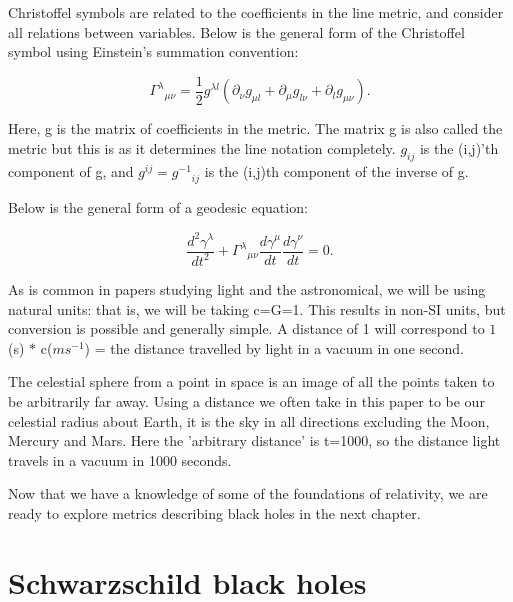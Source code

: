 \documentclass[oneside,openright,frontopenright, singlespacing]{dmathesis}
\begin{document}
\vspace{1em}
	Christoffel symbols are related to the coefficients in the line metric, and consider all relations between variables. Below is the general form of the Christoffel symbol using Einstein's summation convention\cite[pg. 13-14]{albert1916foundation}:
	
	\[{\Gamma^\lambda}_{\mu\nu} = \frac{1}{2}g^{\lambda{l}}(\partial_{\nu}g_{\mu{l}} + \partial_{\mu}g_{l\nu} + \partial_{l}g_{\mu\nu}).\]
	
\vspace{1em}
	Here, g is the matrix of coefficients in the metric. The matrix g is also called the metric but this is as it determines the line notation completely. $g_{ij}$ is the (i,j)'th component of g, and $g^{ij}={g^{-1}}_{ij}$ is the (i,j)th component of the inverse of g.

\vspace{1em}
	Below is the general form of a geodesic equation\cite[pg. 156-157]{schutz2009first}:

	\[\frac{d^2 \gamma^\lambda}{dt^2} + {\Gamma^\lambda}_{\mu\nu} \frac{d\gamma^\mu}{dt} \frac{d\gamma^\nu}{dt} = 0.\]

\vspace{1em}
	As is common in papers studying light and the astronomical, we will be using natural units: that is, we will be taking c=G=1. This results in non-SI units, but conversion is possible and generally simple. A distance of 1 will correspond to $1$(s) $*$ c($ms^{-1}$) = the distance travelled by light in a vacuum in one second.

\vspace{1em}
	The celestial sphere from a point in space is an image of all the points taken to be arbitrarily far away. Using a distance we often take in this paper to be our celestial radius about Earth, it is the sky in all directions excluding the Moon, Mercury and Mars. Here the 'arbitrary distance' is t=1000, so the distance light travels in a vacuum in 1000 seconds.

\vspace{1em}
	Now that we have a knowledge of some of the foundations of relativity, we are ready to explore metrics describing black holes in the next chapter.






\chapter{Schwarzschild black holes}\label{chap:Chapter3}
\end{document}
